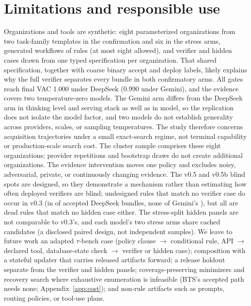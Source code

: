 \documentclass{article}
\begin{document}
\section{Limitations and responsible use}

Organizations and tools are synthetic: eight parameterized organizations from two task-family templates in the confirmation and six in the stress arms, generated workflows of \CRRuleCountRangeWords{} rules (at most eight allowed), and verifier and hidden cases drawn from one typed specification per organization. That shared specification, together with coarse binary accept and deploy labels, likely explains why the full verifier separates every bundle in both confirmatory arms. All gates reach final VAC 1.000 under DeepSeek (0.990 under Gemini), and the evidence covers two temperature-zero models. The Gemini arm differs from the DeepSeek arm in thinking level and serving stack as well as in model, so the replication does not isolate the model factor, and two models do not establish generality across providers, scales, or sampling temperatures. The study therefore concerns acquisition trajectories under a small exact-search regime, not terminal capability or production-scale search cost. The cluster sample comprises these eight organizations; provider repetitions and bootstrap draws do not create additional organizations. The evidence intervention moves one policy and excludes noisy, adversarial, private, or continuously changing evidence. The v0.5 and v0.5b blind spots are designed, so they demonstrate a mechanism rather than estimating how often deployed verifiers are blind; undesigned rules that match no verifier case do occur in v0.3 (in \CRRetainDSConfUnmatchedRuleUnits{} of \CRRetainDSConfAcceptedUnits{} accepted DeepSeek bundles, none of Gemini's \CRRetainGemConfAcceptedUnits{}), but all are dead rules that match no hidden case either. The stress-split hidden panels are not comparable to v0.3's, and each model's two stress arms share cached candidates (a disclosed paired design, not independent samples). We leave to future work an adapted $\tau$-bench case (policy clause $\rightarrow$ conditional rule, API $\rightarrow$ declared tool, database-state check $\rightarrow$ verifier or hidden case); composition with a stateful updater that carries released artifacts forward; a release holdout separate from the verifier and hidden panels; coverage-preserving minimizers and recovery search where exhaustive enumeration is infeasible (BTS's accepted path needs none; Appendix~\ref{app:cost}); and non-rule artifacts such as prompts, routing policies, or tool-use plans.
\end{document}
